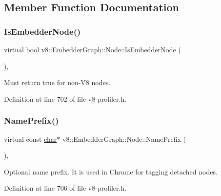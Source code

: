 \subsection{Member Function Documentation}
\mbox{\label{classv8_1_1EmbedderGraph_1_1Node_a62a22058ec311d7e9b6ac8ec061967af}} 
\subsubsection{\texorpdfstring{Is\+Embedder\+Node()}{IsEmbedderNode()}}
{\footnotesize\ttfamily virtual \mbox{\hyperlink{classbool}{bool}} v8\+::\+Embedder\+Graph\+::\+Node\+::\+Is\+Embedder\+Node (\begin{DoxyParamCaption}{ }\end{DoxyParamCaption})\hspace{0.3cm}{\ttfamily [inline]}, {\ttfamily [virtual]}}

Must return true for non-\/\+V8 nodes. 

Definition at line 702 of file v8-\/profiler.\+h.

\mbox{\label{classv8_1_1EmbedderGraph_1_1Node_a2c4c64b2c3eab48dcdc587aec8734ee8}} 
\subsubsection{\texorpdfstring{Name\+Prefix()}{NamePrefix()}}
{\footnotesize\ttfamily virtual const \mbox{\hyperlink{classchar}{char}}$\ast$ v8\+::\+Embedder\+Graph\+::\+Node\+::\+Name\+Prefix (\begin{DoxyParamCaption}{ }\end{DoxyParamCaption})\hspace{0.3cm}{\ttfamily [inline]}, {\ttfamily [virtual]}}

Optional name prefix. It is used in Chrome for tagging detached nodes. 

Definition at line 706 of file v8-\/profiler.\+h.

